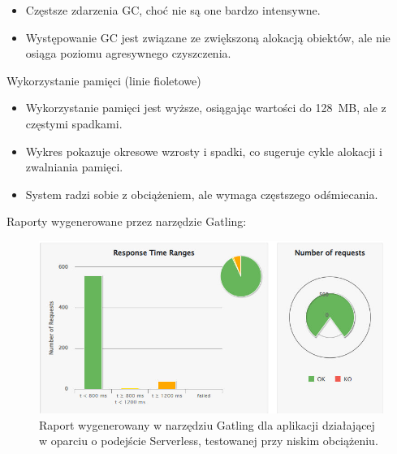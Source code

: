 \documentclass[runningheads,12pt]{llncs}
\begin{document}
\begin{itemize}
    \item Częstsze zdarzenia GC, choć nie są one bardzo intensywne.
    \item Występowanie GC jest związane ze zwiększoną alokacją obiektów, ale nie osiąga poziomu agresywnego czyszczenia.
\end{itemize}

Wykorzystanie pamięci (linie fioletowe)

\begin{itemize}
    \item Wykorzystanie pamięci jest wyższe, osiągając wartości do 128~MB, ale z częstymi spadkami.
    \item Wykres pokazuje okresowe wzrosty i spadki, co sugeruje cykle alokacji i zwalniania pamięci.
    \item System radzi sobie z obciążeniem, ale wymaga częstszego odśmiecania.
\end{itemize}


\newpage


Raporty wygenerowane przez narzędzie Gatling:

\begin{figure}
    \includegraphics[width=\linewidth]{images/serverless-gatling-low-graph.jpg}
    \caption{Raport wygenerowany w narzędziu Gatling dla aplikacji działającej w oparciu o podejście Serverless, testowanej przy niskim obciążeniu.} \label{fig1}
\end{figure}
\end{document}
